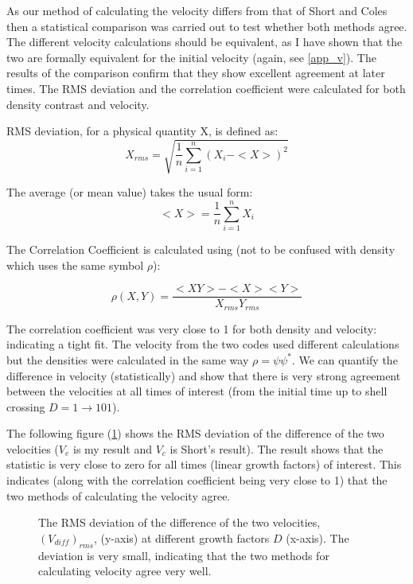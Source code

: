 As our method of calculating the velocity differs from that of Short and Coles then a statistical comparison was carried out to test whether both methods agree. The different velocity calculations should be equivalent, as I have shown that the two are formally equivalent for the initial velocity (again, see \ref{app_v}). The results of the comparison confirm that they show excellent agreement at later times. The RMS deviation and the correlation coefficient were calculated for both density contrast and velocity.

\noindent RMS deviation, for a physical quantity X, is defined as:
\begin{equation}
X_{rms} = \sqrt {\frac{1}{n} \sum_{i=1}^{n} (X_i - <X>)^2}
\end{equation}

\noindent The average (or mean value) takes the usual form:
\begin{equation}
<X>  = \frac{1}{n} \sum_{i=1}^{n} X_i
\end{equation}

\noindent The Correlation Coefficient is calculated using (not to be confused with density which uses the same symbol $\rho$):

\begin{equation}
\rho (X,Y) = \frac{<XY> -<X><Y>}{X_{rms} Y_{rms}}
\end{equation}

\noindent The correlation coefficient was very close to 1 for both density and velocity: indicating a tight fit. The velocity from the two codes used different calculations but the densities were calculated in the same way $\rho = \psi \psi^*$. We can quantify the difference in velocity (statistically) and show that there is very strong agreement between the velocities at all times of interest (from the initial time up to shell crossing $D=1 \rightarrow 101$).

The following figure (\ref{fig.rms_vel}) shows the RMS deviation of the difference of the two velocities ($V_e$ is my result and $V_c$ is Short's result). The result shows that the statistic is very close to zero for all times (linear growth factors) of interest. This indicates (along with the correlation coefficient being very close to 1) that the two methods of calculating the velocity agree.


\begin{figure}[htb]
   \begin{center}
     \leavevmode %
                \epsfxsize=80mm
                 \nolinebreak

   \end{center}
\caption{The RMS deviation of the difference of the two velocities, $(V_{diff})_{rms}$, (y-axis) at different growth factors $D$ (x-axis). The deviation is very small, indicating that the two methods for calculating velocity agree very well.}
\label{fig.rms_vel}
\end{figure} 

